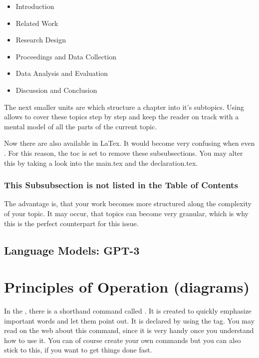 \begin{itemize}
	\item Introduction
	\item Related Work
	\item Research Design
	\item Proceedings and Data Collection
	\item Data Analysis and Evaluation
	\item Discussion and Conclusion
\end{itemize}
\ThinHRule

The next smaller units are  which structure a chapter into it's subtopics. Using  allows to cover these topics step by step and keep the reader on track with a mental model of all the parts of the current topic.\\
\ThinHRule

Now there are also  available in LaTex. It would become very confusing when even . For this reason, the toc is set to remove these subsubsections. You may alter this by taking a look into the main.tex and the declaration.tex. 
\ThinHRule

\subsubsection{\textcolor{SECTION_COL}{This Subsubsection is not listed in the Table of Contents}}

The advantage is, that your work becomes more structured along the complexity of your topic. It may occur, that topics can become very granular, which is why this is the perfect counterpart for this issue.

\subsection{Language Models: GPT-3}


\section{Principles of Operation (diagrams) }

In the , there is a shorthand command called . It is created to quickly emphasize important words and let them point out. It is declared by using the  tag. You may read on the web about this command, since it is very handy once you understand how to use it. You can of course create your own commands but you can also stick to this, if you want to get things done fast.


